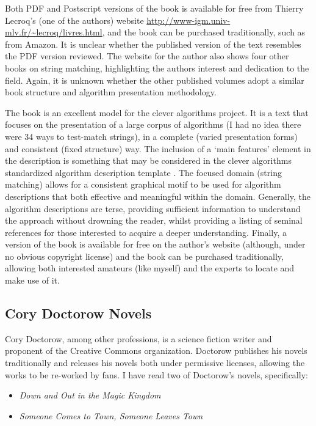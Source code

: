 \documentclass[a4paper, 11pt]{article}
\begin{document}
Both PDF and Postscript versions of the book is available for free from Thierry Lecroq's (one of the authors) website \url{http://www-igm.univ-mlv.fr/~lecroq/livres.html}, and the book can be purchased traditionally, such as from Amazon. It is unclear whether the published version of the text resembles the PDF version reviewed. The website for the author also shows four other books on string matching, highlighting the authors interest and dedication to the field. Again, it is unknown whether the other published volumes adopt a similar book structure and algorithm presentation methodology.

The book is an excellent model for the clever algorithms project. It is a text that focuses on the presentation of a large corpus of algorithms (I had no idea there were 34 ways to test-match strings), in a complete (varied presentation forms) and consistent (fixed structure) way. The inclusion of a `main features' element in the description is something that may be considered in the clever algorithms standardized algorithm description template \cite{Brownlee2010a}. The focused domain (string matching) allows for a consistent graphical motif to be used for algorithm descriptions that both effective and meaningful within the domain. Generally, the algorithm descriptions are terse, providing sufficient information to understand the approach without drowning the reader, whilst providing a listing of seminal references for those interested to acquire a deeper understanding. Finally, a version of the book is available for free on the author's website (although, under no obvious copyright license) and the book can be purchased traditionally, allowing both interested amateurs (like myself) and the experts to locate and make use of it.

% 
% 
\subsection{Cory Doctorow Novels}
\label{subsec:doctorow}
Cory Doctorow, among other professions, is a science fiction writer and proponent of the Creative Commons organization. Doctorow publishes his novels traditionally and releases his novels both under permissive licenses, allowing the works to be re-worked by fans. I have read two of Doctorow's novels, specifically: 

\begin{itemize}
	\item \emph{Down and Out in the Magic Kingdom} \cite{Doctorow2003}
	\item \emph{Someone Comes to Town, Someone Leaves Town} \cite{Doctorow2006}
\end{itemize}
\end{document}
